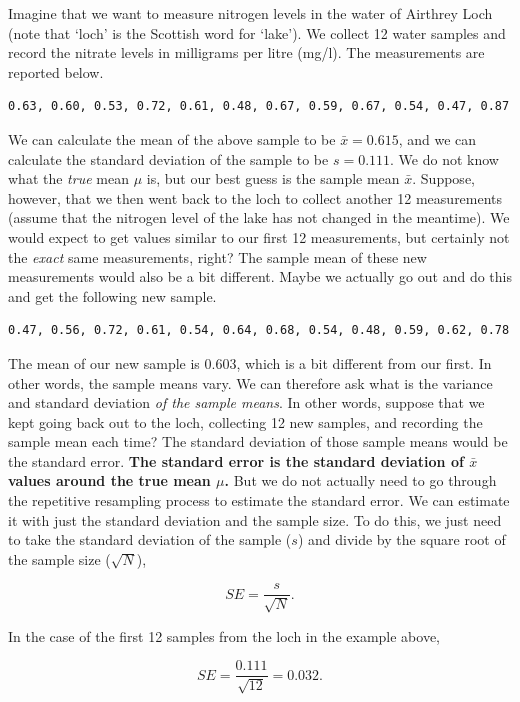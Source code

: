 \documentclass[
  openany]{scrbook}
\begin{document}
Imagine that we want to measure nitrogen levels in the water of Airthrey Loch (note that `loch' is the Scottish word for `lake').
We collect 12 water samples and record the nitrate levels in milligrams per litre (mg/l).
The measurements are reported below.

\begin{verbatim}
0.63, 0.60, 0.53, 0.72, 0.61, 0.48, 0.67, 0.59, 0.67, 0.54, 0.47, 0.87
\end{verbatim}

We can calculate the mean of the above sample to be \(\bar{x} = 0.615\), and we can calculate the standard deviation of the sample to be \(s = 0.111\).
We do not know what the \emph{true} mean \(\mu\) is, but our best guess is the sample mean \(\bar{x}\).
Suppose, however, that we then went back to the loch to collect another 12 measurements (assume that the nitrogen level of the lake has not changed in the meantime).
We would expect to get values similar to our first 12 measurements, but certainly not the \emph{exact} same measurements, right?
The sample mean of these new measurements would also be a bit different.
Maybe we actually go out and do this and get the following new sample.

\begin{verbatim}
0.47, 0.56, 0.72, 0.61, 0.54, 0.64, 0.68, 0.54, 0.48, 0.59, 0.62, 0.78
\end{verbatim}

The mean of our new sample is 0.603, which is a bit different from our first.
In other words, the sample means vary.
We can therefore ask what is the variance and standard deviation \emph{of the sample means}.
In other words, suppose that we kept going back out to the loch, collecting 12 new samples, and recording the sample mean each time?
The standard deviation of those sample means would be the standard error.
\textbf{The standard error is the standard deviation of \(\bar{x}\) values around the true mean \(\mu\).}
But we do not actually need to go through the repetitive resampling process to estimate the standard error.
We can estimate it with just the standard deviation and the sample size.
To do this, we just need to take the standard deviation of the sample (\(s\)) and divide by the square root of the sample size (\(\sqrt{N}\)),

\[SE = \frac{s}{\sqrt{N}}.\]

In the case of the first 12 samples from the loch in the example above,

\[SE = \frac{0.111}{\sqrt{12}} = 0.032.\]
\end{document}
